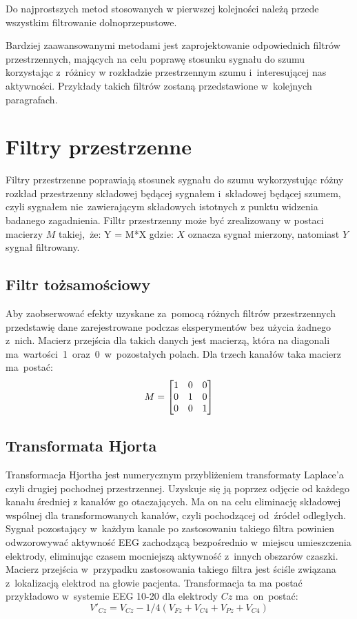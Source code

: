 \documentclass[licencjacka,openright]{pracamgr}
\begin{document}
Do najprostszych metod stosowanych w pierwszej kolejności należą przede wszystkim filtrowanie dolnoprzepustowe.

Bardziej zaawansowanymi metodami jest zaprojektowanie odpowiednich filtrów przestrzennych, mających na celu poprawę stosunku sygnału do szumu korzystając z~różnicy w rozkładzie przestrzennym szumu i~interesującej nas aktywności. Przykłady takich filtrów zostaną przedstawione w~kolejnych paragrafach.

\section{Filtry przestrzenne}
Filtry przestrzenne poprawiają stosunek sygnału do szumu wykorzystując różny rozkład przestrzenny składowej będącej sygnałem i~składowej będącej szumem, czyli sygnałem nie~zawierającym składowych istotnych z punktu widzenia badanego zagadnienia.
Filltr przestrzenny może być zrealizowany w postaci macierzy $M$ takiej,~że: 
Y = M*X
gdzie: $X$ oznacza sygnał mierzony, natomiast $Y$ sygnał filtrowany.

\subsection{Filtr tożsamościowy}
Aby zaobserwować efekty uzyskane za~pomocą różnych filtrów przestrzennych przedstawię dane zarejestrowane podczas eksperymentów bez użycia żadnego z~nich. Macierz przejścia dla takich danych jest macierzą, która na diagonali ma~wartości~1~oraz~0~w~pozostałych polach.
Dla trzech kanałów taka macierz ma~postać:
\[
M =
\begin{bmatrix}
  $1$ & $0$ & $0$ \\
  $0$ & $1$ & $0$ \\
  $0$ & $0$ & $1$ 
\end{bmatrix}
\]

\subsection{Transformata Hjorta}
Transformacja Hjortha \citep{hjorth1975} jest numerycznym przybliżeniem transformaty Laplace'a czyli drugiej pochodnej przestrzennej. Uzyskuje się ją poprzez odjęcie od każdego kanału średniej z kanałów go otaczających. Ma on na celu eliminację składowej wspólnej dla transformowanych kanałów, czyli pochodzącej od~źródeł odległych. Sygnał pozostający w~każdym kanale po zastosowaniu takiego filtra powinien odwzorowywać aktywność EEG zachodzącą bezpośrednio w~miejscu umieszczenia elektrody, eliminując czasem mocniejszą aktywność z~innych obszarów czaszki.
Macierz przejścia w~przypadku zastosowania takiego filtra jest ściśle związana z~lokalizacją elektrod na głowie pacjenta.
Transformacja ta ma postać przykładowo w~systemie EEG 10-20 dla elektrody $Cz$ ma~on~postać:
\begin{equation}
V'_{Cz} = V_{Cz} - 1/4(V_{Fz}+V_{C4}+V_{Pz}+V_{C4})
\end{equation}
\end{document}
